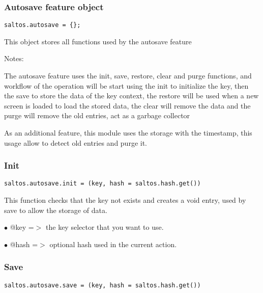 \documentclass[a4paper]{article}
\begin{document}
\hypertarget{toc593}{}
\subsubsection{Autosave feature object}

\begin{lstlisting}
saltos.autosave = {};
\end{lstlisting}

This object stores all functions used by the autosave feature

Notes:

The autosave feature uses the init, save, restore, clear and purge functions, and
workflow of the operation will be start using the init to initialize the key, then
the save to store the data of the key context, the restore will be used when a new
screen is loaded to load the stored data, the clear will remove the data and the
purge will remove the old entries, act as a garbage collector

As an additional feature, this module uses the storage with the timestamp, this
usage allow to detect old entries and purge it.

\hypertarget{toc594}{}
\subsubsection{Init}

\begin{lstlisting}
saltos.autosave.init = (key, hash = saltos.hash.get())
\end{lstlisting}

This function checks that the key not exists and creates a void entry, used by
save to allow the storage of data.

\begin{compactitem}
\item[\color{myblue}$\bullet$] @key  =$>$ the key selector that you want to use.
\item[\color{myblue}$\bullet$] @hash =$>$ optional hash used in the current action.
\end{compactitem}

\hypertarget{toc595}{}
\subsubsection{Save}

\begin{lstlisting}
saltos.autosave.save = (key, hash = saltos.hash.get())
\end{lstlisting}
\end{document}
